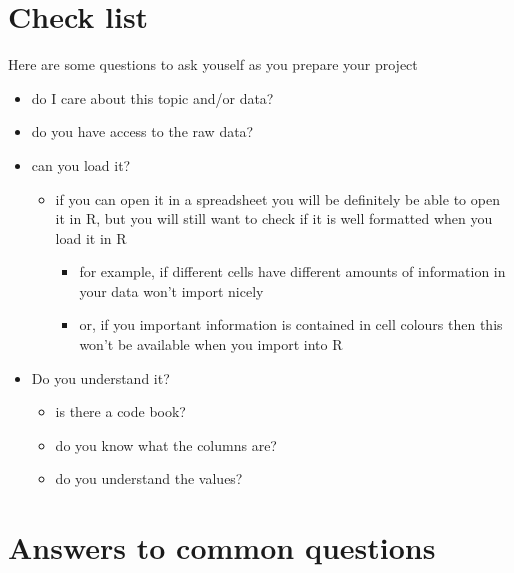 \documentclass[
]{book}
\providecommand{\tightlist}{%
  \setlength{\itemsep}{0pt}\setlength{\parskip}{0pt}}
\begin{document}
\hypertarget{check-list}{%
\section{Check list}\label{check-list}}

Here are some questions to ask youself as you prepare your project

\begin{itemize}
\tightlist
\item
  do I care about this topic and/or data?
\item
  do you have access to the raw data?
\item
  can you load it?

  \begin{itemize}
  \tightlist
  \item
    if you can open it in a spreadsheet you will be definitely be able to open it in R, but you will still want to check if it is well formatted when you load it in R

    \begin{itemize}
    \tightlist
    \item
      for example, if different cells have different amounts of information in your data won't import nicely
    \item
      or, if you important information is contained in cell colours then this won't be available when you import into R
    \end{itemize}
  \end{itemize}
\item
  Do you understand it?

  \begin{itemize}
  \tightlist
  \item
    is there a code book?
  \item
    do you know what the columns are?
  \item
    do you understand the values?
  \end{itemize}
\end{itemize}

\hypertarget{answers-to-common-questions}{%
\section{Answers to common questions}\label{answers-to-common-questions}}
\end{document}

